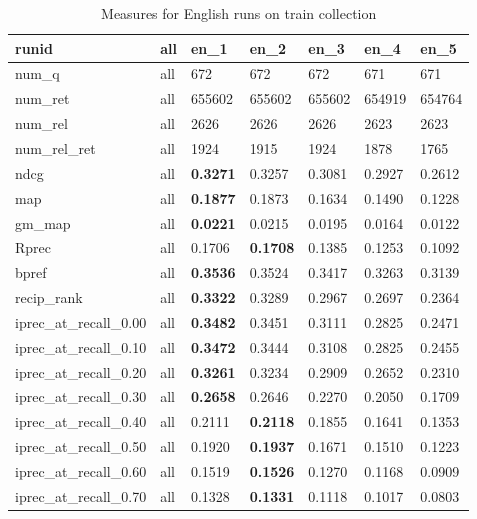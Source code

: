 \begin{table}[tbp]
\caption{Measures for English runs on train collection}
  \label{tab:all-measures-english}
    \centering
    \begin{tabular}{|l|l|l|l|l|l|l|}
    \toprule
	runid & all & en\_1 & en\_2 & en\_3 & en\_4 & en\_5  \\
	\midrule
        num\_q & all & 672 & 672 & 672 & 671 & 671  \\ 
        num\_ret & all & 655602 & 655602 & 655602 & 654919 & 654764  \\ 
        num\_rel & all & 2626 & 2626 & 2626 & 2623 & 2623  \\ 
        num\_rel\_ret & all & 1924 & 1915 & 1924 & 1878 & 1765  \\ \midrule
	ndcg & all & \textbf{0.3271} & 0.3257 & 0.3081 & 0.2927 & 0.2612  \\ \midrule
        map & all & \textbf{0.1877} & 0.1873 & 0.1634 & 0.1490 & 0.1228  \\ 
        gm\_map & all & \textbf{0.0221} & 0.0215 & 0.0195 & 0.0164 & 0.0122  \\ \midrule
        Rprec & all & 0.1706 & \textbf{0.1708} & 0.1385 & 0.1253 & 0.1092  \\ 
        bpref & all & \textbf{0.3536} & 0.3524 & 0.3417 & 0.3263 & 0.3139  \\ 
        recip\_rank & all & \textbf{0.3322} & 0.3289 & 0.2967 & 0.2697 & 0.2364  \\ \midrule
        iprec\_at\_recall\_0.00 & all & \textbf{0.3482} & 0.3451 & 0.3111 & 0.2825 & 0.2471  \\ 
        iprec\_at\_recall\_0.10 & all & \textbf{0.3472} & 0.3444 & 0.3108 & 0.2825 & 0.2455  \\ 
        iprec\_at\_recall\_0.20 & all & \textbf{0.3261} & 0.3234 & 0.2909 & 0.2652 & 0.2310  \\ 
        iprec\_at\_recall\_0.30 & all & \textbf{0.2658} & 0.2646 & 0.2270 & 0.2050 & 0.1709  \\ 
        iprec\_at\_recall\_0.40 & all & 0.2111 & \textbf{0.2118} & 0.1855 & 0.1641 & 0.1353  \\ 
        iprec\_at\_recall\_0.50 & all & 0.1920 & \textbf{0.1937} & 0.1671 & 0.1510 & 0.1223  \\ 
        iprec\_at\_recall\_0.60 & all & 0.1519 & \textbf{0.1526} & 0.1270 & 0.1168 & 0.0909  \\ 
        iprec\_at\_recall\_0.70 & all & 0.1328 & \textbf{0.1331} & 0.1118 & 0.1017 & 0.0803  \\ 

\end{tabular}
\end{table}
